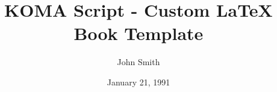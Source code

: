 \documentclass[a4paper,11pt]{scrbook}
\begin{document}
\title{\textbf{KOMA Script - Custom LaTeX Book Template}}
\author{John Smith}
\date{January 21, 1991}


\maketitle






\tableofcontents



\pagestyle{fancy}
\renewcommand*{\chaptermark}[1]{\markboth{\thechapter.~~#1}{}}
\renewcommand*{\sectionmark}[1]{\markright{\thesection.~~#1}}







\nocite{*}



\end{document}

